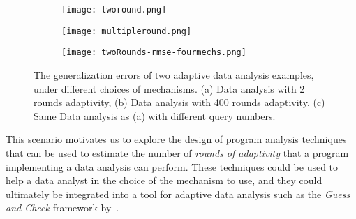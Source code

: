 {\small
\begin{figure}
\centering
\begin{subfigure}{.32\textwidth}
\begin{centering}
\texttt{[image: tworound.png]}
\caption{}
\end{centering}
\end{subfigure}
\quad
\begin{subfigure}{.32\textwidth}
\begin{centering}
\texttt{[image: multipleround.png]}
\caption{}
\end{centering}
\end{subfigure}
\begin{subfigure}{.32\textwidth}
\begin{centering}
\texttt{[image: twoRounds-rmse-fourmechs.png]}
\caption{}
\end{centering}
\end{subfigure}
\vspace{-0.5cm}
 \caption{
 The generalization errors of two adaptive data analysis examples, under different choices of mechanisms.
 (a) Data analysis with 2 rounds adaptivity, 
 (b) Data analysis with 400 rounds adaptivity.
 (c) Same Data analysis as (a) with different query numbers.
}
\label{fig:generalization_errors}
\end{figure}
}

This scenario motivates us to explore the design of program analysis techniques that can be used to estimate the number of \emph{rounds of adaptivity} that a program implementing a data analysis can perform. These techniques could be used to help a data analyst in the choice of the mechanism to use,
and they
could ultimately be integrated into a tool for adaptive data analysis such as the \emph{Guess and Check} framework by~\cite{RogersRSSTW20}. 
